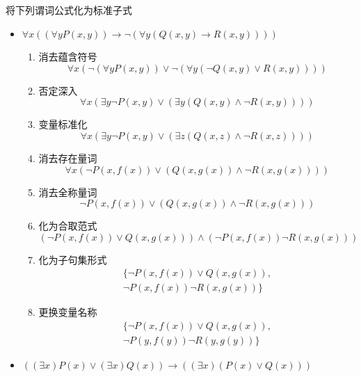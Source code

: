 \begin{example}
    将下列谓词公式化为标准子式
    \begin{itemize}
        \item $\forall x\left( \left( \forall y P(x,y) \right) \to \lnot \left( \forall y\left( Q(x,y)\to R(x,y) \right) \right) \right)$
        \begin{enumerate}
            \item 消去蕴含符号
            \[
                \forall x\left(\lnot \left( \forall y P(x,y) \right) \lor \lnot \left( \forall y\left( \lnot Q(x,y)\lor R(x,y) \right) \right) \right)
            \]
            \item 否定深入
            \[
                \forall x\left(\exists y \lnot P(x,y)  \lor \left( \exists y\left( Q(x,y)\land \lnot R(x,y) \right) \right) \right)            
            \]
            \item 变量标准化
            \[
                \forall x\left(\exists y \lnot P(x,y)  \lor \left( \exists z\left( Q(x,z)\land \lnot R(x,z) \right) \right) \right)
            \]
            \item 消去存在量词
            \[
                \forall x\left(\lnot P(x,f(x))  \lor \left( Q(x,g(x))\land \lnot R(x,g(x)) \right) \right)
            \]
            \item 消去全称量词
            \[
                \lnot P(x,f(x))  \lor \left( Q(x,g(x))\land \lnot R(x,g(x)) \right)
            \]
            \item 化为合取范式 
            \[
                \left( \lnot P(x,f(x)) \lor Q(x,g(x)) \right) \land  \left(\lnot P(x,f(x)) \lnot R(x,g(x)) \right)
            \]
            \item 化为子句集形式
            \[
                \begin{array}{l}
                    \{  \lnot P(x,f(x)) \lor Q(x,g(x)),\\ 
                    \lnot P(x,f(x)) \lnot R(x,g(x)) \}
                \end{array}
            \]
            \item 更换变量名称
            \[
                \begin{array}{l}
                    \{  \lnot P(x,f(x)) \lor Q(x,g(x)),\\ 
                    \lnot P(y,f(y)) \lnot R(y,g(y)) \}
                \end{array}
            \]
        \end{enumerate}
        \item $\left( (\exists x)P(x)\lor (\exists x)Q(x) \right)\to \left( (\exists x)(P(x)\lor Q(x)) \right)$

\end{itemize}
\end{example}
